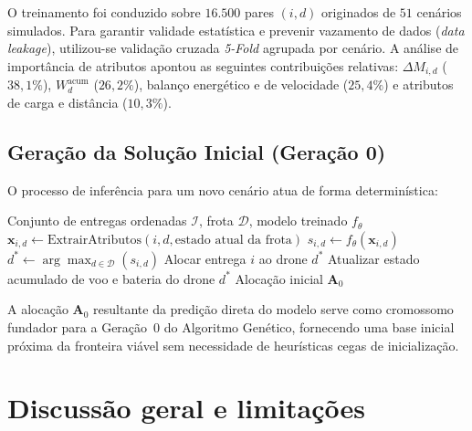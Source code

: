 O treinamento foi conduzido sobre $16.500$ pares $(i, d)$ originados de $51$ cenários simulados. Para garantir validade estatística e prevenir vazamento de dados (\textit{data leakage}), utilizou-se validação cruzada \textit{5-Fold} agrupada por cenário. A análise de importância de atributos apontou as seguintes contribuições relativas: $\Delta M_{i,d}$ ($38{,}1\%$), $W^{\text{acum}}_{d}$ ($26{,}2\%$), balanço energético e de velocidade ($25{,}4\%$) e atributos de carga e distância ($10{,}3\%$).

\subsection{Geração da Solução Inicial (Geração 0)}
O processo de inferência para um novo cenário atua de forma determinística:

\begin{algorithm}[H]
\caption{Alocação Direta via IA (Geração 0)}
\begin{algorithmic}[1]
\REQUIRE Conjunto de entregas ordenadas $\mathcal{I}$, frota $\mathcal{D}$, modelo treinado $f_\theta$
        \STATE $\mathbf{x}_{i,d} \leftarrow \text{ExtrairAtributos}(i, d, \text{estado atual da frota})$
        \STATE $s_{i,d} \leftarrow f_\theta(\mathbf{x}_{i,d})$
    \ENDFOR
    \STATE $d^* \leftarrow \arg\max_{d \in \mathcal{D}} (s_{i,d})$
    \STATE Alocar entrega $i$ ao drone $d^*$
    \STATE Atualizar estado acumulado de voo e bateria do drone $d^*$
\ENDFOR
\RETURN Alocação inicial $\mathbf{A}_0$
\end{algorithmic}
\end{algorithm}

A alocação $\mathbf{A}_0$ resultante da predição direta do modelo serve como cromossomo fundador para a Geração~0 do Algoritmo Genético, fornecendo uma base inicial próxima da fronteira viável sem necessidade de heurísticas cegas de inicialização.



\section{Discussão geral e limitações}\label{sec:discussao_limitacoes}

